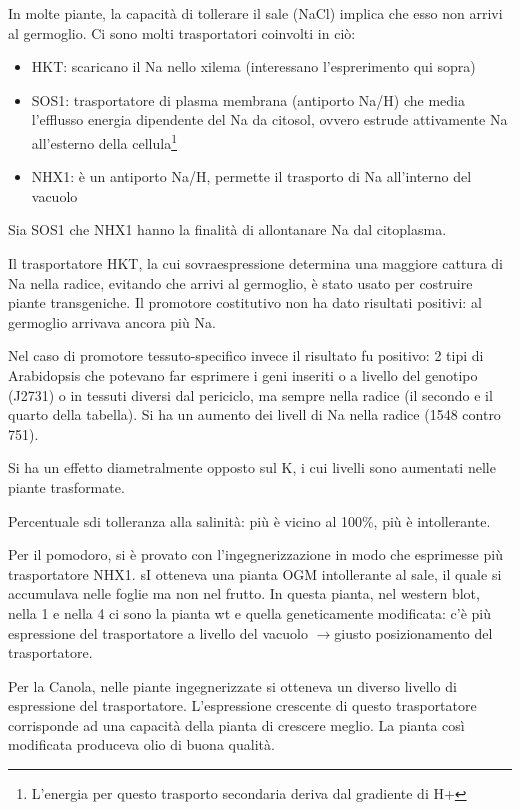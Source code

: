 \documentclass[a4paper,12pt]{book}
\newcommand{\lfreccia}{\ensuremath{\longrightarrow}}
\begin{document}
In molte piante, la capacità di tollerare il sale (NaCl) implica che esso non arrivi al germoglio. Ci sono molti trasportatori coinvolti in ciò:
\begin{itemize}
\item{HKT: scaricano il Na nello xilema (interessano l'esprerimento qui sopra)}
\item{SOS1: trasportatore di plasma membrana (antiporto Na/H) che media l'efflusso energia dipendente del Na da citosol, ovvero estrude attivamente Na all'esterno della cellula\footnote{L'energia per questo trasporto secondaria deriva dal gradiente di H+}}
\item{NHX1: è un antiporto Na/H, permette il trasporto di Na all'interno del vacuolo}
\end{itemize}

Sia SOS1 che NHX1 hanno la finalità di allontanare Na dal citoplasma.

Il trasportatore HKT, la cui sovraespressione determina una maggiore cattura di Na nella radice, evitando che arrivi al germoglio, è stato usato per costruire piante transgeniche. Il promotore costitutivo non ha dato risultati positivi: al germoglio arrivava ancora più Na.

Nel caso di promotore tessuto-specifico invece il risultato fu positivo: 2 tipi di Arabidopsis che potevano far esprimere i geni inseriti o a livello del genotipo (J2731) o in tessuti diversi dal periciclo, ma sempre nella radice (il secondo e il quarto della tabella). Si ha un aumento dei livell di Na nella radice (1548 contro 751).

Si ha un effetto diametralmente opposto sul K, i cui livelli sono aumentati nelle piante trasformate. 

Percentuale sdi tolleranza alla salinità: più è vicino al 100\%, più è intollerante.

Per il pomodoro, si è provato con l'ingegnerizzazione in modo che esprimesse più trasportatore NHX1. sI otteneva una pianta OGM intollerante al sale, il quale si accumulava nelle foglie ma non nel frutto. In questa pianta, nel western blot, nella 1 e nella 4 ci sono la pianta wt e quella geneticamente modificata: c'è più espressione del trasportatore a livello del vacuolo \lfreccia giusto posizionamento del trasportatore.

Per la Canola, nelle piante ingegnerizzate si otteneva un diverso livello di espressione del trasportatore. L'espressione crescente di questo trasportatore corrisponde ad una capacità della pianta di crescere meglio. La pianta così modificata produceva olio di buona qualità.
\end{document}
